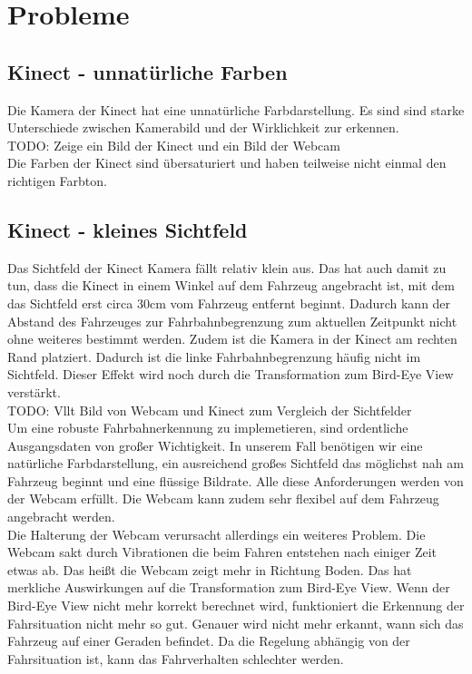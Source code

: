 \chapter{Probleme}
\label{cha:Probleme}

\section{Kinect - unnatürliche Farben}
\label{sec:farben}
Die Kamera der Kinect hat eine unnatürliche Farbdarstellung.
Es sind sind starke Unterschiede zwischen Kamerabild und der Wirklichkeit zur erkennen.
\\
TODO: Zeige ein Bild der Kinect und ein Bild der Webcam
\\
Die Farben der Kinect sind übersaturiert und haben teilweise nicht einmal den richtigen Farbton.

\section{Kinect - kleines Sichtfeld}
\label{sec:sichtfeld}
Das Sichtfeld der Kinect Kamera fällt relativ klein aus.
Das hat auch damit zu tun, dass die Kinect in einem Winkel auf dem Fahrzeug angebracht ist, mit dem das Sichtfeld erst circa 30cm vom Fahrzeug entfernt beginnt.
Dadurch kann der Abstand des Fahrzeuges zur Fahrbahnbegrenzung zum aktuellen Zeitpunkt nicht ohne weiteres bestimmt werden. 
Zudem ist die Kamera in der Kinect am rechten Rand platziert.
Dadurch ist die linke Fahrbahnbegrenzung häufig nicht im Sichtfeld.
Dieser Effekt wird noch durch die Transformation zum Bird-Eye View verstärkt.
\\
TODO: Vllt Bild von Webcam und Kinect zum Vergleich der Sichtfelder
\\
Um eine robuste Fahrbahnerkennung zu implemetieren, sind ordentliche Ausgangsdaten von großer Wichtigkeit.
In unserem Fall benötigen wir eine natürliche Farbdarstellung, ein ausreichend großes Sichtfeld das möglichst nah am Fahrzeug beginnt und eine flüssige Bildrate. 
Alle diese Anforderungen werden von der Webcam erfüllt.
Die Webcam kann zudem sehr flexibel auf dem Fahrzeug angebracht werden.
\\
Die Halterung der Webcam verursacht allerdings ein weiteres Problem.
Die Webcam sakt durch Vibrationen die beim Fahren entstehen nach einiger Zeit etwas ab.
Das heißt die Webcam zeigt mehr in Richtung Boden.
Das hat merkliche Auswirkungen auf die Transformation zum Bird-Eye View.
Wenn der Bird-Eye View nicht mehr korrekt berechnet wird, funktioniert die Erkennung der Fahrsituation nicht mehr so gut.
Genauer wird nicht mehr erkannt, wann sich das Fahrzeug auf einer Geraden befindet.
Da die Regelung abhängig von der Fahrsituation ist, kann das Fahrverhalten schlechter werden.

